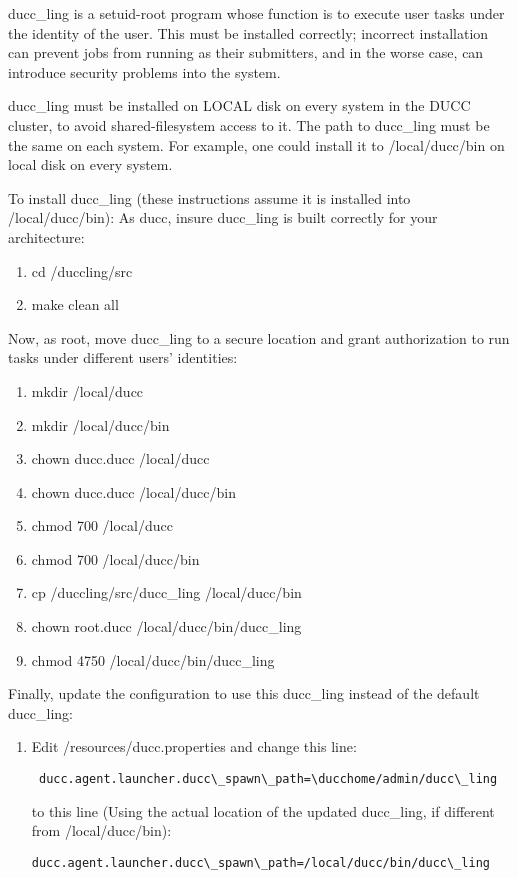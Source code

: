     ducc\_ling is a setuid-root program whose function is to execute user tasks under the identity of
    the user.  This must be installed correctly; incorrect installation can prevent jobs from running as
    their submitters, and in the worse case, can introduce security problems into the system.

    ducc\_ling must be installed on LOCAL disk on every system in the DUCC cluster, to avoid
    shared-filesystem access to it.  The path to ducc\_ling must be the same on each system.  For
    example, one could install it to /local/ducc/bin on local disk on every system.

    To install ducc\_ling (these instructions assume it is installed into /local/ducc/bin):
    As ducc, insure ducc\_ling is built correctly for your architecture:
    \begin{enumerate}
        \item cd \duccruntime/duccling/src
        \item make clean all
     \end{enumerate}
        
     Now, as root, move ducc\_ling to a secure location and grant authorization to run tasks under
     different users' identities:
     \begin{enumerate}
         \item mkdir /local/ducc
         \item mkdir /local/ducc/bin
         \item chown ducc.ducc /local/ducc
         \item chown ducc.ducc /local/ducc/bin
         \item chmod 700 /local/ducc
         \item chmod 700 /local/ducc/bin
         \item cp \duccruntime/duccling/src/ducc\_ling /local/ducc/bin
         \item chown root.ducc /local/ducc/bin/ducc\_ling
         \item chmod 4750 /local/ducc/bin/ducc\_ling
      \end{enumerate}
         
      Finally, update the configuration to use this ducc\_ling instead of the default ducc\_ling:
      \begin{enumerate}
        \item Edit \duccruntime/resources/ducc.properties and change this line:         
\begin{verbatim}
 ducc.agent.launcher.ducc\_spawn\_path=\ducchome/admin/ducc\_ling
\end{verbatim}
          to this line (Using the actual location of the updated ducc\_ling, if different from /local/ducc/bin):
\begin{verbatim}
ducc.agent.launcher.ducc\_spawn\_path=/local/ducc/bin/ducc\_ling
\end{verbatim}
        \end{enumerate}


